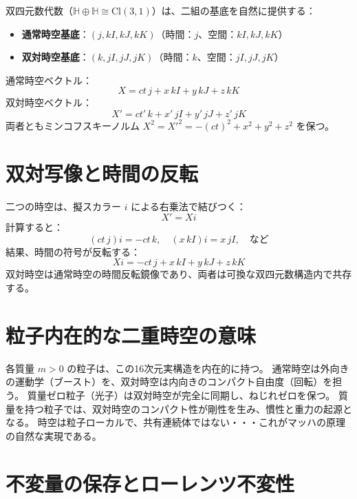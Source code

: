 \documentclass[dvipdfmx,a4paper]{jsbook}
\theoremstyle{definition}
\theoremstyle{remark}
\begin{document}
双四元数代数（$\mathbb{H} \oplus \mathbb{H} \cong \mathrm{Cl}(3,1)$）は、二組の基底を自然に提供する：
\begin{itemize}
  \item \textbf{通常時空基底}：$(j, kI, kJ, kK)$（時間：$j$、空間：$kI, kJ, kK$）
  \item \textbf{双対時空基底}：$(k, jI, jJ, jK)$（時間：$k$、空間：$jI, jJ, jK$）
\end{itemize}
通常時空ベクトル：
\begin{equation}
  X = ct \, j + x \, kI + y \, kJ + z \, kK
\end{equation}
双対時空ベクトル：
\begin{equation}
  X' = ct' \, k + x' \, jI + y' \, jJ + z' \, jK
\end{equation}
両者ともミンコフスキーノルム $X^2 = X'^2 = -(ct)^2 + x^2 + y^2 + z^2$ を保つ。

\section{双対写像と時間の反転}
\label{sec:dual-map}

二つの時空は、擬スカラー $i$ による右乗法で結びつく：
\begin{equation}
  X' = X i
\end{equation}
計算すると：
\begin{equation}
  (ct \, j) i = -ct \, k, \quad (x \, kI) i = x \, jI, \quad \text{など}
\end{equation}
結果、時間の符号が反転する：
\begin{equation}
  X i = -ct \, j + x \, kI + y \, kJ + z \, kK
\end{equation}
双対時空は通常時空の時間反転鏡像であり、両者は可換な双四元数構造内で共存する。

\section{粒子内在的な二重時空の意味}
\label{sec:particle-intrinsic}

各質量 $m > 0$ の粒子は、この16次元実構造を内在的に持つ。
通常時空は外向きの運動学（ブースト）を、双対時空は内向きのコンパクト自由度（回転）を担う。
質量ゼロ粒子（光子）は双対時空が完全に同期し、ねじれゼロを保つ。
質量を持つ粒子では、双対時空のコンパクト性が剛性を生み、慣性と重力の起源となる。
時空は粒子ローカルで、共有連続体ではない・・・これがマッハの原理の自然な実現である。

\section{不変量の保存とローレンツ不変性}
\label{sec:invariants}
\end{document}
